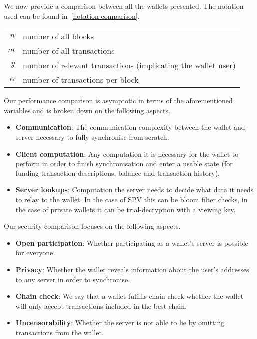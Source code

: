 We now provide a comparison between all the wallets presented. The notation used can be found in~\cref{notation-comparison}.

\begin{table*}
    \caption{The notation used throughout our comparison.\label{notation-comparison}}
    \centering
    \begin{tabular}{r|l}
    $n$ & number of all blocks \\
    $m$ & number of all transactions \\
    $y$ & number of relevant transactions (implicating the wallet user) \\
    $\alpha$ & number of transactions per block \\
    \end{tabular}
\end{table*}

Our performance comparison is asymptotic in terms of the aforementioned variables and is broken down on the following aspects.

\begin{itemize}
    \item \textbf{Communication}: The communication complexity between the wallet and server necessary to fully synchronise from scratch.
    \item \textbf{Client computation}: Any computation it is necessary for the wallet to perform in order to finish synchronisation and enter a usable state (for funding transaction descriptions, balance and transaction history).
    \item \textbf{Server lookups}: Computation the server needs to decide what data it needs to relay to the wallet. In the case of SPV this can be bloom filter checks, in the case of private wallets it can be trial-decryption with a viewing key.
\end{itemize}

Our security comparison focuses on the following aspects.
\begin{itemize}
    \item \textbf{Open participation}: Whether participating as a wallet's server is possible for everyone.
    \item \textbf{Privacy}: Whether the wallet reveals information about the user's addresses to any server in order to synchronise.
    \item \textbf{Chain check}: We say that a wallet fulfills chain check whether the wallet will only accept transactions included in the best chain.
    \item \textbf{Uncensorability}: Whether the server is not able to lie by omitting transactions from the wallet.
\end{itemize}

